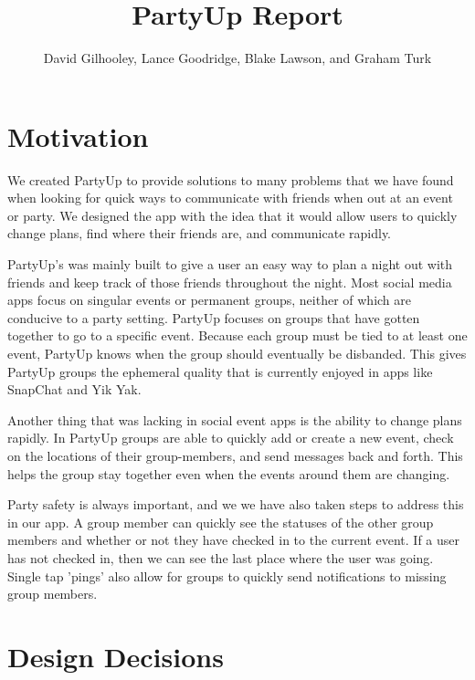 \documentclass[12pt]{article}
\title{PartyUp Report}
\author{David Gilhooley, Lance Goodridge, Blake Lawson, and Graham Turk}
\begin{document}
\pagestyle{plain}

\maketitle

\section{Motivation} %
\label{sec:Motivation}
We created PartyUp to provide solutions to many problems that we have found when looking for quick ways to communicate with friends when out at an event or party. We designed the app with the idea that it would allow users to quickly change plans, find where their friends are, and communicate rapidly.

PartyUp's was mainly built to give a user an easy way to plan a night out with friends and keep track of those friends throughout the night. Most social media apps focus on singular events or permanent groups, neither of which are conducive to a party setting.
PartyUp focuses on groups that have gotten together to go to a specific event. Because each group must be tied to at least one event, PartyUp knows when the group should eventually be disbanded. This gives PartyUp groups the ephemeral quality that is currently enjoyed in apps like SnapChat and Yik Yak.

Another thing that was lacking in social event apps is the ability to change plans rapidly. In PartyUp groups are able to quickly add or create a new event, check on the locations of their group-members, and send messages back and forth. This helps the group stay together even when the events around them are changing. 

Party safety is always important, and we we have also taken steps to address this in our app. A group member can quickly see the statuses of the other group members and whether or not they have checked in to the current event. If a user has not checked in, then we can see the last place where the user was going. Single tap 'pings' also allow for groups to quickly send notifications to missing group members.

\section{Design Decisions} %
\label{sec:design_decisions}

\end{document}
